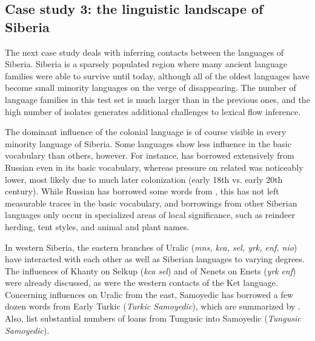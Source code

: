 \subsection{Case study 3: the linguistic landscape of Siberia}
The next case study deals with inferring contacts between the languages of Siberia. Siberia is a sparsely populated region where many ancient language families were able to survive until today, although all of the oldest languages have become small minority languages on the verge of disappearing. The number of language families in this test set is much larger than in the previous ones, and the high number of isolates generates additional challenges to lexical flow inference.

The dominant influence of the colonial language  is of course visible in every minority language of Siberia. Some languages show less influence in the basic vocabulary than others, however. For instance,  has borrowed extensively from Russian even in its basic vocabulary, whereas pressure on related  was noticeably lower, most likely due to much later colonization (early 18th vs. early 20th century). While Russian has borrowed some words from , this has not left measurable traces in the basic vocabulary, and borrowings from other Siberian languages only occur in specialized areas of local significance, such as reindeer herding, tent styles, and animal and plant names.

In western Siberia, the eastern branches of Uralic (\textit{mns, kca, sel, yrk, enf, nio}) have interacted with each other as well as Siberian languages to varying degrees. The influences of Khanty on Selkup (\textit{kca} \arrowOA \textit{sel}) and of Nenets on Enets (\textit{yrk} \arrowOA \textit{enf}) were already discussed, as were the western contacts of the Ket language. Concerning influences on Uralic from the east, Samoyedic has borrowed a few dozen words from Early Turkic (\textit{Turkic \arrowLA Samoyedic}), which are summarized by \cite{dybo2007}. Also, \cite{anikin_helimski_2007} list substantial numbers of loans from Tungusic into Samoyedic (\textit{Tungusic} \arrowLA \textit{Samoyedic}).

